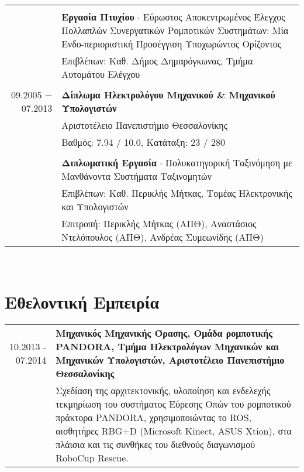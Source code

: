 \documentclass[a4paper,10pt,twoside]{article}
\begin{document}
\begin{tabular}{rp{11cm}}
&\\                 & \textbf{Εργασία Πτυχίου} $\cdot$ Εύρωστος Αποκεντρωμένος Έλεγχος Πολλαπλών Συνεργατικών Ρομποτικών Συστημάτων: Μία Ενδο-περιοριστική
                      Προσέγγιση Υποχωρώντος Ορίζοντος \\
                    & Επιβλέπων: Καθ. Δήμος Δημαρόγκωνας, Τμήμα Αυτομάτου Ελέγχου\\
&\\
09.2005 $-$ 07.2013 & \textbf{Δίπλωμα Ηλεκτρολόγου Μηχανικού \& Μηχανικού Υπολογιστών} \\
                    & Αριστοτέλειο Πανεπιστήμιο Θεσσαλονίκης \\
                    & Βαθμός: 7.94 / 10.0, Κατάταξη: 23 / 280 \\
&\\
                    & \textbf{Διπλωματική Εργασία} $\cdot$ Πολυκατηγορική Ταξινόμηση με Μανθάνοντα Συστήματα Ταξινομητών\\
                    & Επιβλέπων: Καθ. Περικλής Μήτκας, Τομέας Ηλεκτρονικής και Υπολογιστών\\
                    & Επιτροπή: Περικλής Μήτκας (ΑΠΘ), Αναστάσιος Ντελόπουλος (ΑΠΘ), Ανδρέας Συμεωνίδης (ΑΠΘ) \\
\end{tabular}\\




\section{Εθελοντική Εμπειρία}

\begin{tabular}{rp{12cm}}
10.2013 - 07.2014 & \textbf{Μηχανικός Μηχανικής Όρασης, Ομάδα ρομποτικής PANDORA,
                    Τμήμα Ηλεκτρολόγων Μηχανικών και Μηχανικών Υπολογιστών, Αριστοτέλειο Πανεπιστήμιο Θεσσαλονίκης} \\
                  & Σχεδίαση της αρχιτεκτονικής, υλοποίηση και ενδελεχής τεκμηρίωση
                    του συστήματος Εύρεσης Οπών του ρομποτικού πράκτορα PANDORA, χρησιμοποιώντας το ROS, αισθητήρες RBG+D
                    (Microsoft Kinect, ASUS Xtion), στα πλάισια και τις συνθήκες του διεθνούς διαγωνισμού RoboCup Rescue.\\
\end{tabular} \\
\end{document}

